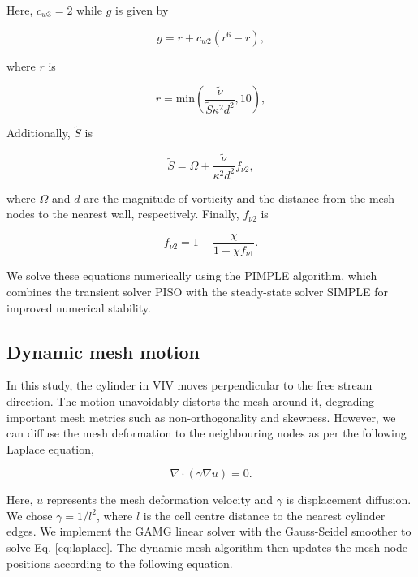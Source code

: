 \documentclass[a4paper,fleqn]{cas-sc}
\begin{document}
\noindent Here, $c_{w3} = 2$ while $g$ is given by

\begin{equation}
  g = r + c_{w2} \left( r^{6} - r \right),
  \label{eq:g}
\end{equation}

\noindent where $r$ is

\begin{equation}
  r = \text{min} \left( \frac{\tilde{\nu}}{\tilde{S} \kappa^{2} d^{2}}, 10 \right),
  \label{eq:r}
\end{equation}

Additionally, $\tilde{S}$ is

\begin{equation}
  \tilde{S} = \Omega + \frac{\tilde{\nu}}{\kappa^{2} d^{2}} f_{\nu 2},
  \label{eq:sTilde}
\end{equation}

\noindent where $\Omega$ and $d$ are the magnitude of vorticity and the distance from the mesh nodes to the nearest wall, respectively. Finally, $f_{\nu 2}$ is

\begin{equation}
  f_{\nu 2} = 1 - \frac{\chi}{1 + \chi f_{\nu 1}}.
  \label{eq:fv2}
\end{equation}

\noindent We solve these equations numerically using the PIMPLE algorithm, which combines the transient solver PISO with the steady-state solver SIMPLE for improved numerical stability.

\subsection{Dynamic mesh motion} \label{ssec:dynMesh}

In this study, the cylinder in VIV moves perpendicular to the free stream direction. The motion unavoidably distorts the mesh around it, degrading important mesh metrics such as non-orthogonality and skewness. However, we can diffuse the mesh deformation to the neighbouring nodes as per the following Laplace equation,

\begin{equation}
  \nabla \cdot \left( \gamma \nabla u \right) = 0.
  \label{eq:laplace}
\end{equation}

\noindent Here, $u$ represents the mesh deformation velocity and $\gamma$ is displacement diffusion. We chose $\gamma = 1/l^{2}$, where $l$ is the cell centre distance to the nearest cylinder edges. We implement the GAMG linear solver with the Gauss-Seidel smoother to solve Eq. \ref{eq:laplace}. The dynamic mesh algorithm then updates the mesh node positions according to the following equation.
\end{document}
